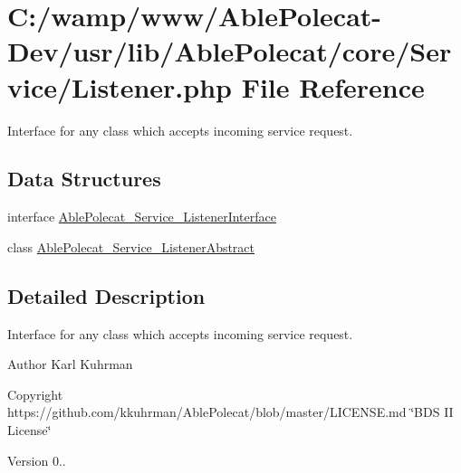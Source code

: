 \hypertarget{_listener_8php}{}\section{C\+:/wamp/www/\+Able\+Polecat-\/\+Dev/usr/lib/\+Able\+Polecat/core/\+Service/\+Listener.php File Reference}
\label{_listener_8php}


Interface for any class which accepts incoming service request.  


\subsection*{Data Structures}
\begin{DoxyCompactItemize}
\item 
interface \hyperlink{interface_able_polecat___service___listener_interface}{Able\+Polecat\+\_\+\+Service\+\_\+\+Listener\+Interface}
\item 
class \hyperlink{class_able_polecat___service___listener_abstract}{Able\+Polecat\+\_\+\+Service\+\_\+\+Listener\+Abstract}
\end{DoxyCompactItemize}


\subsection{Detailed Description}
Interface for any class which accepts incoming service request. 

\begin{DoxyAuthor}{Author}
Karl Kuhrman 
\end{DoxyAuthor}
\begin{DoxyCopyright}{Copyright}
https\+://github.com/kkuhrman/\+Able\+Polecat/blob/master/\+L\+I\+C\+E\+N\+S\+E.\+md \char`\"{}\+B\+D\+S I\+I License\char`\"{} 
\end{DoxyCopyright}
\begin{DoxyVersion}{Version}
0.. 
\end{DoxyVersion}
